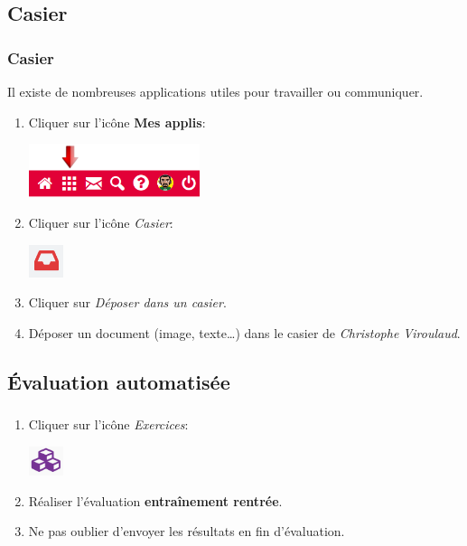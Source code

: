 \documentclass[svgnames,11pt]{beamer}
\begin{document}
\subsection{Casier}
\begin{frame}
    \frametitle{Casier}

Il existe de nombreuses applications utiles pour travailler ou communiquer.
\begin{activite}
\begin{enumerate}
    \item Cliquer sur l'icône \textbf{Mes applis}:
    \begin{center}
    \centering
    \includegraphics[width=5cm]{ressources/bandeauapp.png}
    \end{center} 
    \item Cliquer sur l'icône \emph{Casier}:
    \begin{center}
    \centering
    \includegraphics[width=1cm]{ressources/casier.png}
    \end{center}
    \item Cliquer sur \emph{Déposer dans un casier}.
    \item Déposer un document (image, texte\dots) dans le casier de \emph{Christophe Viroulaud}.
\end{enumerate}
\end{activite}

\end{frame}
\subsection{Évaluation automatisée}
\begin{frame}
    \frametitle{}

    \begin{activite}
        \begin{enumerate}
            \item Cliquer sur l'icône \emph{Exercices}:
            \begin{center}
            \centering
            \includegraphics[width=1cm]{ressources/exercices.png}
            \end{center}
            \item Réaliser l'évaluation \textbf{entraînement rentrée}.
            \item Ne pas oublier d'envoyer les résultats en fin d'évaluation.
        \end{enumerate}
        \end{activite}

\end{frame}
\end{document}
